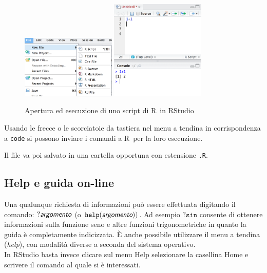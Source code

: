 \documentclass[onecolumn,11pt]{book}
\newcommand{\varia}[1]{\textsl{\textsf{#1}}}
\newcommand{\rst}{\textsf{RStudio}~}
\newcommand{\rpr}{\textsf{R}~}
\begin{document}
\begin{figure} 
\includegraphics[width=0.4\textwidth]{grafici/Rscript.png}\hskip40pt
\includegraphics[width=0.4\textwidth]{grafici/esecuzione.png}
\caption{Apertura  ed esecuzione di uno script di \rpr in  \rst }
\label{fig::Rstudioscript} \end{figure}

Usando le frecce o le scorciatoie da tastiera nel menu a tendina in corrispondenza a \texttt{code} si possono inviare i comandi a \rpr per la loro esecuzione.
 

Il file va poi salvato in una cartella opportuna  con estensione \texttt{.R}.

 \subsection*{Help e guida on-line}
Una qualunque richiesta di informazioni pu\`o essere effettuata digitando il comando:
$?\varia{argomento}$   (o $\texttt{help}(\varia{argomento}))$.
Ad esempio $?\texttt{sin}$  consente di ottenere informazioni sulla funzione seno e altre funzioni trigonometriche in quanto la guida \`e completamente indicizzata. \`E anche possibile utilizzare il menu a tendina ({\it help}), con modalit\`a diverse a seconda del sistema operativo.\\
In RStudio basta invece clicare sul menu Help selezionare la casellina Home e scrivere il comando al quale si \`e interessati.
\end{document}
